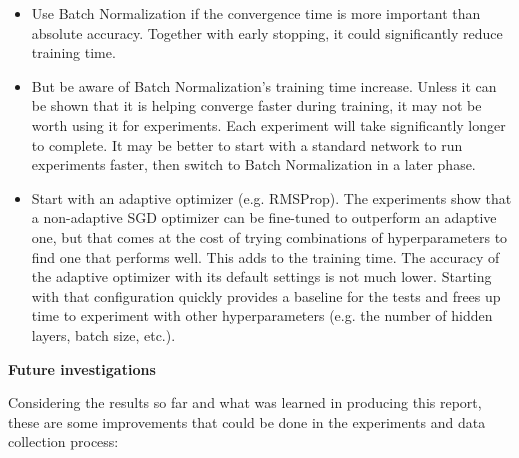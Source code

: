 \documentclass[../CAP6619_term_project_cgarbin.tex]{subfiles}
\begin{document}
\begin{itemize}
\item Use Batch Normalization if the convergence time is more important than absolute accuracy. Together with early stopping, it could significantly reduce training time.
\item But be aware of Batch Normalization's training time increase. Unless it can be shown that it is helping converge faster during training, it may not be worth using it for experiments. Each experiment will take significantly longer to complete. It may be better to start with a standard network to run experiments faster, then switch to Batch Normalization in a later phase.
\item Start with an adaptive optimizer (e.g. RMSProp). The experiments show that a non-adaptive SGD optimizer can be fine-tuned to outperform an adaptive one, but that comes at the cost of trying combinations of hyperparameters to find one that performs well. This adds to the training time. The accuracy of the adaptive optimizer with its default settings is not much lower. Starting with that configuration quickly provides a baseline for the tests and frees up time to experiment with other hyperparameters (e.g. the number of hidden layers, batch size, etc.). 
\end{itemize}


\medskip
\textbf{Future investigations}

Considering the results so far and what was learned in producing this report, these are some improvements that could be done in the experiments and data collection process:
\end{document}
